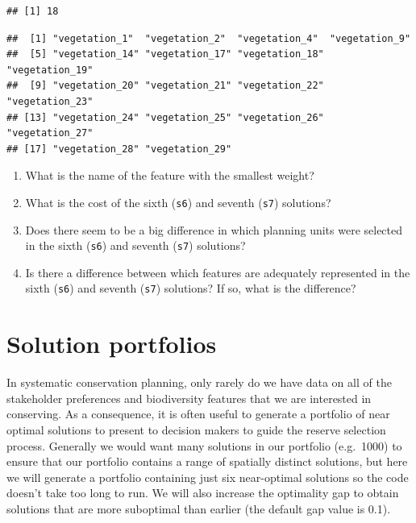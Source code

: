 \documentclass[
  12pt,
]{book}
\makeatletter
\newenvironment{Shaded}{\begin{snugshade}}{\end{snugshade}}
\newcommand{\CommentTok}[1]{\textcolor[rgb]{0.56,0.35,0.01}{\textit{#1}}}
\newcommand{\FloatTok}[1]{\textcolor[rgb]{0.00,0.00,0.81}{#1}}
\newcommand{\FunctionTok}[1]{\textcolor[rgb]{0.00,0.00,0.00}{#1}}
\newcommand{\NormalTok}[1]{#1}
\newcommand{\SpecialCharTok}[1]{\textcolor[rgb]{0.00,0.00,0.00}{#1}}
\providecommand{\tightlist}{%
  \setlength{\itemsep}{0pt}\setlength{\parskip}{0pt}}
\newenvironment{kframe}{%
\medskip{}
\setlength{\fboxsep}{.8em}
 \def\at@end@of@kframe{}%
 \ifinner\ifhmode%
  \def\at@end@of@kframe{\end{minipage}}%
  \begin{minipage}{\columnwidth}%
 \fi\fi%
 \def\FrameCommand##1{\hskip\@totalleftmargin \hskip-\fboxsep
 \colorbox{shadecolor}{##1}\hskip-\fboxsep
     \hskip-\linewidth \hskip-\@totalleftmargin \hskip\columnwidth}%
 \MakeFramed {\advance\hsize-\width
   \@totalleftmargin\z@ \linewidth\hsize
   \@setminipage}}%
 {\par\unskip\endMakeFramed%
 \at@end@of@kframe}
\newenvironment{rmdblock}[1]
  {
  \begin{itemize}
  \renewcommand{\labelitemi}{
    \raisebox{-.7\height}[0pt][0pt]{
      {\setkeys{Gin}{width=3em,keepaspectratio}\texttt{[image: images/\#1]}}
    }
  }
  \setlength{\fboxsep}{1em}
  \begin{kframe}
  \item
  }
  {
  \end{kframe}
  \end{itemize}
  }
\newenvironment{rmdquestion}
  {\begin{rmdblock}{question}}
  {\end{rmdblock}}
\makeatother
\begin{document}
\begin{verbatim}
## [1] 18
\end{verbatim}

\begin{Shaded}
\end{Shaded}

\begin{verbatim}
##  [1] "vegetation_1"  "vegetation_2"  "vegetation_4"  "vegetation_9" 
##  [5] "vegetation_14" "vegetation_17" "vegetation_18" "vegetation_19"
##  [9] "vegetation_20" "vegetation_21" "vegetation_22" "vegetation_23"
## [13] "vegetation_24" "vegetation_25" "vegetation_26" "vegetation_27"
## [17] "vegetation_28" "vegetation_29"
\end{verbatim}

\begin{rmdquestion}
\begin{enumerate}
\def\labelenumi{\arabic{enumi}.}
\tightlist
\item
  What is the name of the feature with the smallest weight?
\item
  What is the cost of the sixth (\texttt{s6}) and seventh (\texttt{s7}) solutions?
\item
  Does there seem to be a big difference in which planning units were selected in the sixth (\texttt{s6}) and seventh (\texttt{s7}) solutions?
\item
  Is there a difference between which features are adequately represented in the sixth (\texttt{s6}) and seventh (\texttt{s7}) solutions? If so, what is the difference?
\end{enumerate}
\end{rmdquestion}

\hypertarget{solution-portfolios}{%
\section{Solution portfolios}\label{solution-portfolios}}

In systematic conservation planning, only rarely do we have data on all of the stakeholder preferences and biodiversity features that we are interested in conserving. As a consequence, it is often useful to generate a portfolio of near optimal solutions to present to decision makers to guide the reserve selection process. Generally we would want many solutions in our portfolio (e.g.~1000) to ensure that our portfolio contains a range of spatially distinct solutions, but here we will generate a portfolio containing just six near-optimal solutions so the code doesn't take too long to run. We will also increase the optimality gap to obtain solutions that are more suboptimal than earlier (the default gap value is 0.1).
\end{document}

